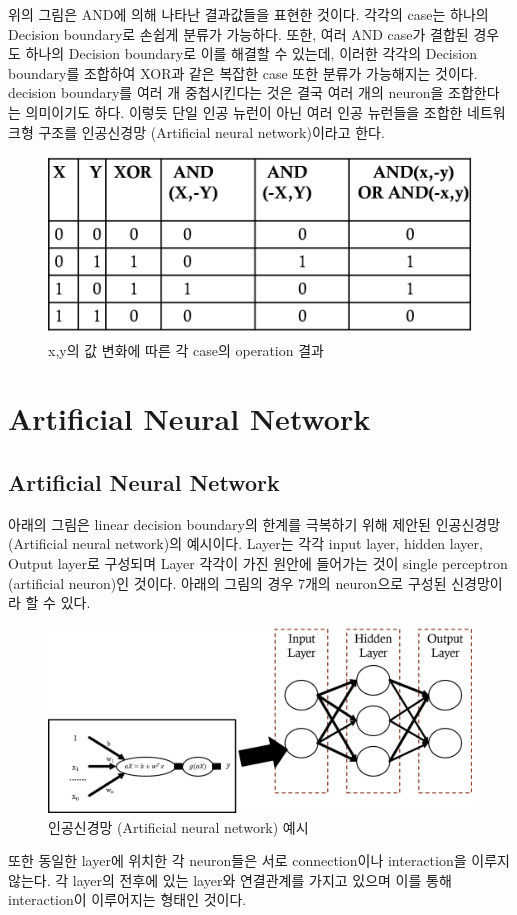 \documentclass[draft=false]{oblivoir}
\begin{document}
위의 그림은 AND에 의해 나타난 결과값들을 표현한 것이다. 각각의 case는 하나의 Decision boundary로 손쉽게 분류가 가능하다. 또한, 여러 AND case가 결합된 경우도 하나의 Decision boundary로 이를 해결할 수 있는데, 이러한 각각의 Decision boundary를 조합하여 XOR과 같은 복잡한 case 또한 분류가 가능해지는 것이다. decision boundary를 여러 개 중첩시킨다는 것은 결국 여러 개의 neuron을 조합한다는 의미이기도 하다. 이렇듯 단일 인공 뉴런이 아닌 여러 인공 뉴런들을 조합한 네트워크형 구조를 인공신경망 (Artificial neural network)이라고 한다.
\begin{figure}[ht] \centering 
\includegraphics[scale=0.5]{fig14_13.png} 
\caption{x,y의 값 변화에 따른 각 case의 operation 결과}
\label{fig:14-13}
\end{figure}

\section{Artificial Neural Network}
\subsection{Artificial Neural Network}
아래의 그림은 linear decision boundary의 한계를 극복하기 위해 제안된 인공신경망 (Artificial neural network)의 예시이다. Layer는 각각 input layer, hidden layer, Output layer로 구성되며 Layer 각각이 가진 원안에 들어가는 것이 single perceptron (artificial neuron)인 것이다. 아래의 그림의 경우 7개의 neuron으로 구성된 신경망이라 할 수 있다. 
\begin{figure}[ht] \centering 
\includegraphics[scale=0.5]{fig14_14.png} 
\caption{인공신경망 (Artificial neural network) 예시}
\label{fig:14-14}
\end{figure}
또한 동일한 layer에 위치한 각 neuron들은 서로 connection이나 interaction을 이루지 않는다. 각 layer의 전후에 있는 layer와 연결관계를 가지고 있으며 이를 통해 interaction이 이루어지는 형태인 것이다. 
\end{document}
